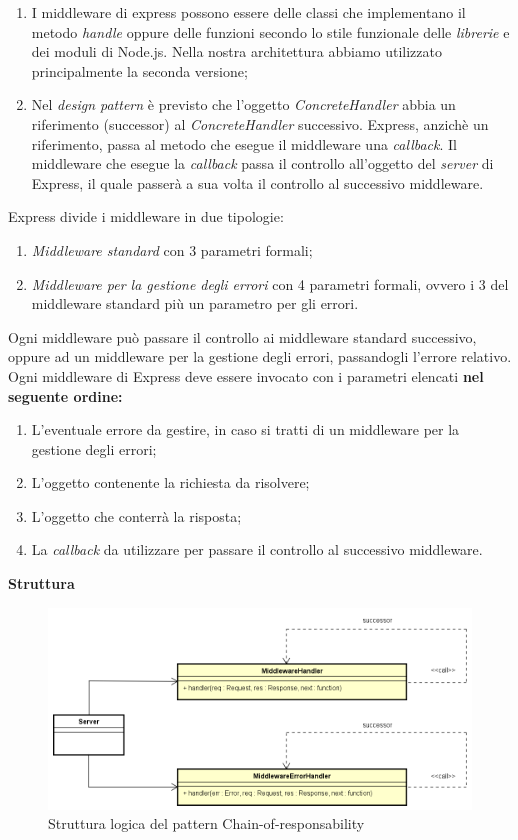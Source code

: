 	\begin{enumerate}
		\item I middleware di express possono essere delle classi che implementano il metodo \textit{handle} oppure delle funzioni secondo lo stile funzionale delle \textit{librerie} e dei moduli di Node.js. Nella nostra architettura abbiamo utilizzato principalmente la seconda versione;
		\item Nel \textit{design pattern} è previsto che l'oggetto \textit{ConcreteHandler} abbia un riferimento (successor) al \textit{ConcreteHandler} successivo. Express, anzichè un riferimento, passa al metodo che esegue il middleware una \textit{callback}. Il middleware che esegue la \textit{callback} passa il controllo all'oggetto del \textit{server} di Express, il quale passerà a sua volta il controllo al successivo middleware.
	\end{enumerate}
Express divide i middleware in due tipologie:
	\begin{enumerate}
		\item \textit{Middleware standard} con 3 parametri formali;
		\item \textit{Middleware per la gestione degli errori} con 4 parametri formali, ovvero i 3 del middleware standard più un parametro per gli errori.
	\end{enumerate}
Ogni middleware può passare il controllo ai middleware standard successivo, oppure ad un middleware per la gestione degli errori, passandogli l'errore relativo. Ogni middleware di Express deve essere invocato con i parametri elencati \textbf{nel seguente ordine:}
	\begin{enumerate}
		\item L'eventuale errore da gestire, in caso si tratti di un middleware per la gestione degli errori;
		\item L'oggetto contenente la richiesta da risolvere;
		\item L'oggetto che conterrà la risposta;
		\item La \textit{callback} da utilizzare per passare il controllo al successivo middleware.
	\end{enumerate}

\textbf{Struttura}
\label{Struttura logica del pattern Chain-of-responsability}
\begin{figure}
	\centering
	\includegraphics[scale=0.50]{UML/strutturaPattern/Chain-of-responsability.png}
	\caption{Struttura logica del pattern Chain-of-responsability}
\end{figure}

